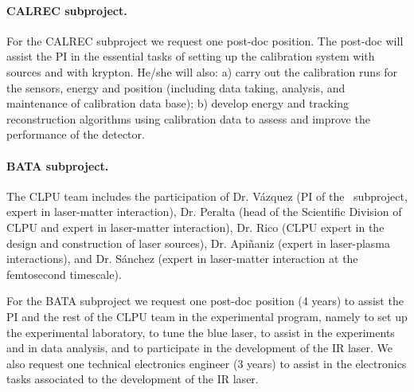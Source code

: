 \paragraph{CALREC subproject.}

For the CALREC subproject we request one post-doc position. The post-doc will assist the PI in the essential tasks of setting up the calibration system with sources and with krypton. He/she will also: a) carry out the calibration runs for the sensors, energy and position (including data taking, analysis, and maintenance of calibration data base); b) develop energy and tracking reconstruction algorithms using calibration data to assess and improve the performance of the detector.

\paragraph{BATA subproject.}

The CLPU team includes the participation of Dr. V\'azquez (PI of the \BATA\ subproject, expert in laser-matter interaction), Dr. Peralta (head of the Scientific Division of CLPU and expert in laser-matter interaction), Dr. Rico (CLPU expert in the design and construction of laser sources), Dr. Api\~naniz (expert in laser-plasma interactions), and Dr. S\'anchez (expert in laser-matter interaction at the femtosecond timescale).

For the BATA subproject we request one post-doc position (4 years) to assist the PI and the rest of the CLPU team in the experimental program, namely to set up the experimental laboratory, to tune the blue laser, to assist in the experiments and in data analysis, and to participate in the development of the IR laser. We also request one technical electronics engineer (3 years) to assist in the electronics tasks associated to the development of the IR laser.  

